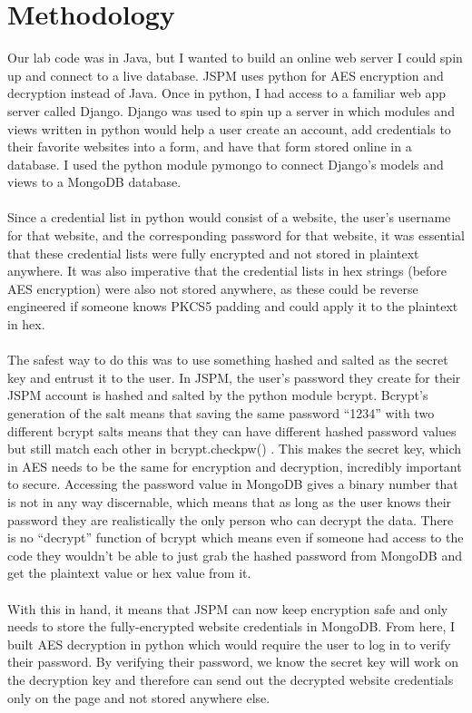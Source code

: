 \section{Methodology}
Our lab code was in Java, but I wanted to build an online web server I could spin up and connect to a live database. JSPM uses python for AES encryption and decryption instead of Java. Once in python, I had access to a familiar web app server called Django. Django was used to spin up a server in which modules and views written in python would help a user create an account, add credentials to their favorite websites into a form, and have that form stored online in a database. I used the python module pymongo to connect Django’s models and views to a MongoDB database. \\\\
Since a credential list in python would consist of a website, the user’s username for that website, and the corresponding password for that website, it was essential that these credential lists were fully encrypted and not stored in plaintext anywhere. It was also imperative that the credential lists in hex strings (before AES encryption) were also not stored anywhere, as these could be reverse engineered if someone knows PKCS5 padding and could apply it to the plaintext in hex. \\\\
The safest way to do this was to use something hashed and salted as the secret key and entrust it to the user. In JSPM, the user’s password they create for their JSPM account is hashed and salted by the python module bcrypt. Bcrypt’s generation of the salt means that saving the same password “1234” with two different bcrypt salts means that they can have different hashed password values but still match each other in bcrypt.checkpw() \cite{karthika2015salt}. This makes the secret key, which in AES needs to be the same for encryption and decryption, incredibly important to secure. Accessing the password value in MongoDB gives a binary number that is not in any way discernable, which means that as long as the user knows their password they are realistically the only person who can decrypt the data. There is no “decrypt” function of bcrypt which means even if someone had access to the code they wouldn’t be able to just grab the hashed password from MongoDB and get the plaintext value or hex value from it. \\\\
With this in hand, it means that JSPM can now keep encryption safe and only needs to store the fully-encrypted website credentials in MongoDB. From here, I built AES decryption in python which would require the user to log in to verify their password. By verifying their password, we know the secret key will work on the decryption key and therefore can send out the decrypted website credentials only on the page and not stored anywhere else.\\\\
